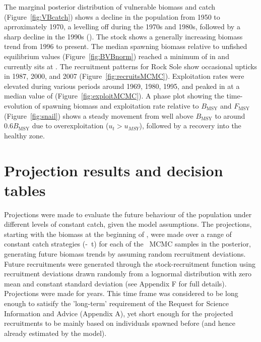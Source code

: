 The marginal posterior distribution of vulnerable biomass and catch (Figure~\ref{fig:VBcatch}) shows a decline in the population from 1950 to aprroximately 1970, a levelling off during the 1970s and 1980s, followed by a sharp decline in the 1990s (). The stock shows a generally increasing biomass trend from 1996 to present.
The median spawning biomass relative to unfished equilibrium values (Figure~\ref{fig:BVBnorm}) reached a minimum of  in  and currently sits at . 
The recruitment patterns for  Rock Sole show occasional upticks in 1987, 2000, and 2007 (Figure~\ref{fig:recruitsMCMC}). 
Exploitation rates were elevated during various periods around 1969, 1980, 1995, and peaked in  at a median value of  (Figure~\ref{fig:exploitMCMC}).
A phase plot showing the time-evolution of spawning biomass and exploitation rate relative to $B_\mathrm{MSY}$ and $F_\mathrm{MSY}$ (Figure~\ref{fig:snail}) shows a steady movement from well above $B_\mathrm{MSY}$ to around $0.6B_\mathrm{MSY}$ due to overexploitation ($u_t > u_{MSY}$), followed by a recovery into the healthy zone.

\section{Projection results and decision tables}

Projections were made to evaluate the future behaviour of the population under different levels of constant catch, given the model assumptions.  The projections, starting with the biomass at the beginning of , were made over a range of constant catch strategies (-~t) for each of the \numMCMC~MCMC samples in the posterior, generating future biomass trends by assuming random recruitment deviations.  Future recruitments were generated through the stock-recruitment function using recruitment deviations drawn randomly from a lognormal distribution with zero mean and constant standard deviation (see Appendix F for full details). Projections were made for  years. This time frame was considered to be long enough to satisify the 'long-term' requirement of the Request for Science Information and Advice (Appendix A), yet short enough for the projected recruitments to be mainly based on individuals spawned before  (and hence already estimated by the model).

